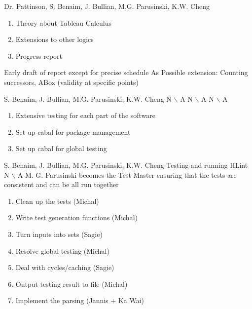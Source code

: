 %
{Dr. Pattinson, S. Benaim, J. Bullian, M.G. Parusinski, K.W. Cheng}%
{\begin{enumerate}
\item Theory about Tableau Calculus
\item Extensions to other logics
\item Progress report
\end{enumerate} }%
{Early draft of report except for precise schedule}
{As Possible extension: Counting successors, ABox (validity at specific points)}%
{}%

%
{S. Benaim, J. Bullian, M.G. Parusinski, K.W. Cheng}%
{N $\backslash$ A}%
{N $\backslash$ A}%
{N $\backslash$ A}
{\begin{enumerate}
\item Extensive testing for each part of the software
\item Set up cabal for package management
\item Set up cabal for global testing
\end{enumerate}}%

%
{S. Benaim, J. Bullian, M.G. Parusinski, K.W. Cheng}%
{Testing and running HLint}%
{N $\backslash$ A}%
{M. G. Parusinski becomes the Test Master ensuring that the tests are consistent and can be all run together}
{\begin{enumerate}
\item Clean up the tests (Michal) 
\item Write test generation functions (Michal)
\item Turn inputs into sets (Sagie)
\item Resolve global testing (Michal)
\item Deal with cycles/caching (Sagie)
\item Output testing result to file (Michal)
\item Implement the parsing (Jannis + Ka Wai)
\end{enumerate}}%

